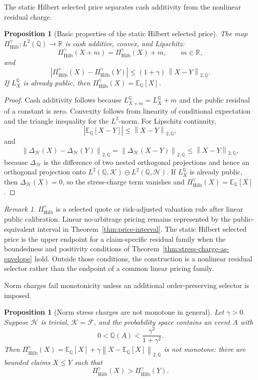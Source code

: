 \documentclass[11pt,a4paper]{amsart}
\theoremstyle{plain}
\newtheorem{proposition}[theorem]{Proposition}
\theoremstyle{definition}
\theoremstyle{remark}
\newtheorem{remark}[theorem]{Remark}
\newcommand{\R}{\mathbb{R}}
\newcommand{\QQ}{\mathbb{Q}}
\newcommand{\EE}{\mathbb{E}}
\newcommand{\cF}{\mathcal{F}}
\newcommand{\cH}{\mathcal{H}}
\newcommand{\cK}{\mathcal{K}}
\newcommand{\norm}[1]{\left\lVert #1\right\rVert}
\begin{document}
The static Hilbert selected price separates cash additivity from the nonlinear residual charge.

\begin{proposition}[Basic properties of the static Hilbert selected price]\label{prop:stress-charge}
The map \(\Pi_{\mathrm{Hilb}}^\gamma:L^2(\QQ)\to\R\) is cash additive, convex, and Lipschitz:
\[
        \Pi_{\mathrm{Hilb}}^\gamma(X+m)=\Pi_{\mathrm{Hilb}}^\gamma(X)+m,\qquad m\in\R,
\]
and
\[
        |\Pi_{\mathrm{Hilb}}^\gamma(X)-\Pi_{\mathrm{Hilb}}^\gamma(Y)|
        \le
        (1+\gamma)\,\norm{X-Y}_{2,\QQ}.
\]
If \(L_X^\QQ\) is already public, then \(\Pi_{\mathrm{Hilb}}^\gamma(X)=\EE_\QQ[X]\).
\end{proposition}

\begin{proof}
Cash additivity follows because \(L_{X+m}^\QQ=L_X^\QQ+m\) and the public residual of a constant is
zero.  Convexity follows from linearity of conditional expectation and the triangle inequality for
the \(L^2\)-norm.  For Lipschitz continuity,
\[
|\EE_\QQ[X-Y]|\le \norm{X-Y}_{2,\QQ},
\]
and
\[
        \norm{\Delta_{\cH}(X)-\Delta_{\cH}(Y)}_{2,\QQ}
        =
        \norm{\Delta_{\cH}(X-Y)}_{2,\QQ}
        \le
        \norm{X-Y}_{2,\QQ},
\]
because \(\Delta_{\cH}\) is the difference of two nested orthogonal projections and hence an
orthogonal projection onto
\(L^2(\QQ,\cK)\ominus L^2(\QQ,\cH)\).  If \(L_X^\QQ\) is already public, then
\(\Delta_{\cH}(X)=0\), so the stress-charge term vanishes and \(\Pi_{\mathrm{Hilb}}^\gamma(X)=\EE_\QQ[X]\).
\end{proof}

\begin{remark}
\(\Pi_{\mathrm{Hilb}}^\gamma\) is a selected quote or risk-adjusted valuation rule after linear public
calibration.  Linear no-arbitrage pricing remains represented by the public-equivalent interval in
Theorem~\ref{thm:price-interval}.  The static Hilbert
selected price is the upper endpoint for a claim-specific residual family when the boundedness and
positivity conditions of Theorem~\ref{thm:stress-charge-as-envelope} hold.  Outside those
conditions, the construction is a nonlinear residual selector rather than the endpoint of a common
linear pricing family.
\end{remark}

Norm charges fail monotonicity unless an additional order-preserving selector is imposed.

\begin{proposition}[Norm stress charges are not monotone in general]\label{prop:stress-charge-not-monotone}
Let \(\gamma>0\).  Suppose \(\cH\) is trivial, \(\cK=\cF\), and the probability space contains an
event \(A\) with
\[
        0<\QQ(A)<\frac{\gamma^2}{1+\gamma^2}.
\]
Then \(\Pi_{\mathrm{Hilb}}^\gamma(X)=\EE_\QQ[X]+\gamma\norm{X-\EE_\QQ[X]}_{2,\QQ}\) is not monotone: there are
bounded claims \(X\le Y\) such that
\[
        \Pi_{\mathrm{Hilb}}^\gamma(X)>\Pi_{\mathrm{Hilb}}^\gamma(Y).
\]
\end{proposition}
\end{document}
